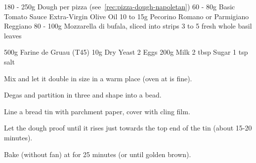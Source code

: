 \begin{ingreds}
	180 - 250g Dough per pizza (see~\ref{rec:pizza-dough-napoletan})
	60 - 80g Basic Tomato Sauce
	Extra-Virgin Olive Oil 
	10 to 15g Pecorino Romano or Parmigiano Reggiano
	80 - 100g Mozzarella di bufala, sliced into strips
	3 to 5 fresh whole basil leaves
\end{ingreds}


\label{rec:bread-brioche}

\begin{ingreds}
	500g Farine de Gruau (T45)
	10g Dry Yeast
	2 Eggs
	200g Milk
	2 tbsp Sugar
	1 tsp salt
\end{ingreds}

\begin{method}[]
	Mix and let it double in size in a warm place (oven at  is fine).

	Degas and partition in three and shape into a bead.

	Line a bread tin with parchment paper, cover with cling film.
	
	Let the dough proof until it rises just towards the top end of the tin (about 15-20 minutes).

	Bake (without fan) at  for 25 minutes (or until golden brown).

\end{method}

